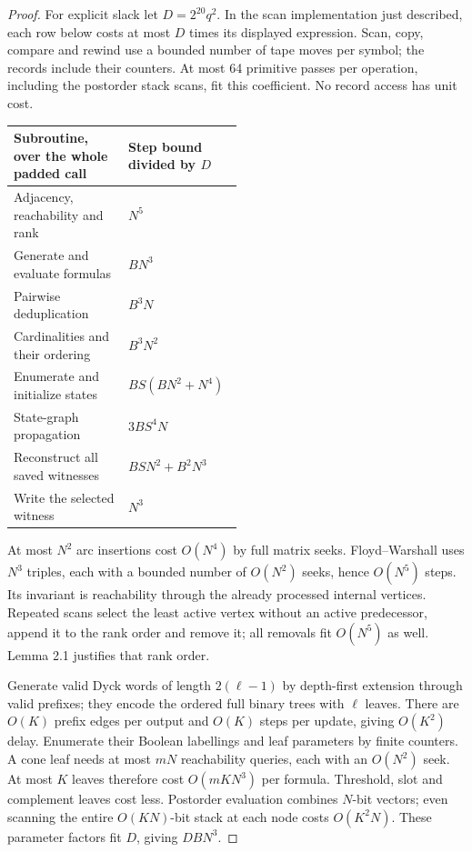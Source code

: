 \begin{proof}
For explicit slack let $D=2^{20}q^2$. In the scan implementation just
described, each row below costs at most $D$ times its displayed
expression. Scan, copy, compare and rewind use a bounded number of tape
moves per symbol; the records include their counters. At most 64
primitive passes per operation, including the postorder stack scans,
fit this coefficient. No record access has unit cost.

\begin{center}\small
\begin{tabularx}{\linewidth}{@{}p{0.50\linewidth}X@{}}
\toprule
Subroutine, over the whole padded call & Step bound divided by $D$\\
\midrule
Adjacency, reachability and rank & $N^5$\\
Generate and evaluate formulas & $BN^3$\\
Pairwise deduplication & $B^3N$\\
Cardinalities and their ordering & $B^3N^2$\\
Enumerate and initialize states & $BS(BN^2+N^4)$\\
State-graph propagation & $3BS^4N$\\
Reconstruct all saved witnesses & $BSN^2+B^2N^3$\\
Write the selected witness & $N^3$\\
\bottomrule
\end{tabularx}
\end{center}

At most $N^2$ arc insertions cost $O(N^4)$ by full matrix seeks.
Floyd--Warshall uses $N^3$ triples, each with a bounded number of
$O(N^2)$ seeks, hence $O(N^5)$ steps. Its invariant is reachability
through the already processed internal vertices. Repeated scans select
the least active vertex without an active predecessor, append it to the
rank order and remove it; all removals fit $O(N^5)$ as well. Lemma 2.1
justifies that rank order.

Generate valid Dyck words of length $2(\ell-1)$ by depth-first
extension through valid prefixes; they encode the ordered full binary
trees with $\ell$ leaves. There are $O(K)$ prefix edges per output and
$O(K)$ steps per update, giving $O(K^2)$ delay. Enumerate their Boolean
labellings and leaf parameters by finite counters. A cone leaf needs at most $mN$
reachability queries, each with an $O(N^2)$ seek. At most $K$ leaves
therefore cost $O(mKN^3)$ per formula. Threshold, slot and complement
leaves cost less. Postorder evaluation combines $N$-bit vectors; even
scanning the entire $O(KN)$-bit stack at each node costs $O(K^2N)$.
These parameter factors fit $D$, giving $DBN^3$.


\end{proof}
